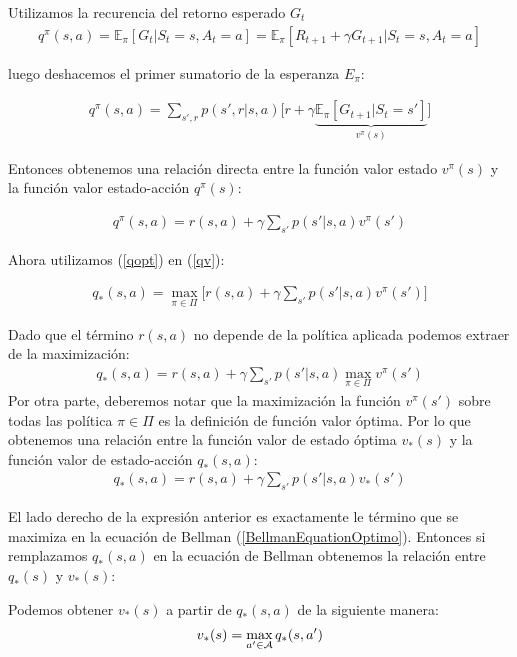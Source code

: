 Utilizamos  la recurencia del retorno esperado $G_t$ 
\begin{gather}
    q^\pi(s,a) = \mathbb{E}_\pi[G_t|S_t = s,A_t=a] =
  \mathbb{E}_\pi[R_{t+1} + \gamma G_{t+1} |S_t = s,A_t=a] 
\end{gather}

luego deshacemos el primer sumatorio de la esperanza $E_\pi$:

\begin{gather}
    q^\pi(s,a) = 
   \sum_{s',r} p(s',r|s,a) \bigg[ r + \gamma \underbrace{\mathbb{E}_\pi[ G_{t+1} |S_t = s']}_{v^\pi(s)} \bigg]
\end{gather}


Entonces obtenemos una relación directa entre la función valor estado $v^\pi(s)$ y la función valor estado-acción $q^\pi(s)$:


\begin{gather}\label{qv}
    q^\pi(s,a) =  r(s,a) + \gamma \sum_{s'}p(s'|s,a) v^\pi(s')
\end{gather}

Ahora utilizamos (\ref{qopt}) en (\ref{qv}):

\begin{gather}
    q_*(s,a) = \max_{\pi \in \Pi} \bigg[ r(s,a) + \gamma \sum_{s'}p(s'|s,a) v^\pi(s') \bigg]
\end{gather}

Dado que el término $r(s,a)$ no depende de la política aplicada podemos extraer  de la maximización:
\begin{gather}
    q_*(s,a) =   r(s,a) +  \gamma \sum_{s'}  p(s'|s,a) \max_{\pi \in \Pi}  v^\pi(s')
\end{gather}
Por otra parte, deberemos notar que  la maximización la función $v^\pi(s')$ sobre todas las política $\pi \in \Pi$ es la definición de función valor óptima. Por lo que obtenemos una relación entre la función valor de estado óptima $v_*(s)$ y la función valor de estado-acción $q_*(s,a)$:
\begin{gather}\label{qoptvopt2}
    q_*(s,a) =   r(s,a) +  \gamma \sum_{s'}  p(s'|s,a)v_*(s')
\end{gather}

El lado derecho de la expresión anterior es exactamente le término que se maximiza en la ecuación de Bellman (\ref{BellmanEquationOptimo}). Entonces si remplazamos $q_*(s,a)$ en la ecuación de Bellman obtenemos la relación entre $q_*(s)$ y $v_*(s)$:
\begin{cor}
    Podemos obtener $v_*(s)$ a partir de $q_*(s,a)$ de la siguiente manera:
    \begin{gather}\label{voptqopt}
        v_*(s) =  \max_{a'\in \mathcal{A}} q_*(s,a')
    \end{gather} 
\end{cor}

